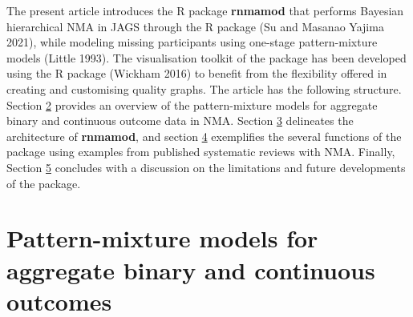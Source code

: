 The present article introduces the R package \textbf{rnmamod} that performs Bayesian
hierarchical NMA in JAGS through the R package  (Su and Masanao Yajima 2021),
while modeling missing participants using one-stage pattern-mixture models (Little 1993).
The visualisation toolkit of the package has been developed using the R package
 (Wickham 2016) to benefit from the flexibility offered in creating
and customising quality graphs. The article has the following structure. Section
\protect\hyperlink{Pattern-mixture-models-for-aggregate-binary-and-continuous-outcomes}{2} provides
an overview of the pattern-mixture models for aggregate binary and continuous
outcome data in NMA. Section \protect\hyperlink{The-architecture-of-ux2fpkgux5cux257Brnmamodux5cux257D}{3} delineates
the architecture of \textbf{rnmamod}, and section \protect\hyperlink{X}{4} exemplifies the several
functions of the package using examples from published systematic reviews with NMA.
Finally, Section \protect\hyperlink{X}{5} concludes with a discussion on the limitations and future
developments of the package.

\hypertarget{pattern-mixture-models-for-aggregate-binary-and-continuous-outcomes}{%
\section{Pattern-mixture models for aggregate binary and continuous outcomes}\label{pattern-mixture-models-for-aggregate-binary-and-continuous-outcomes}}

